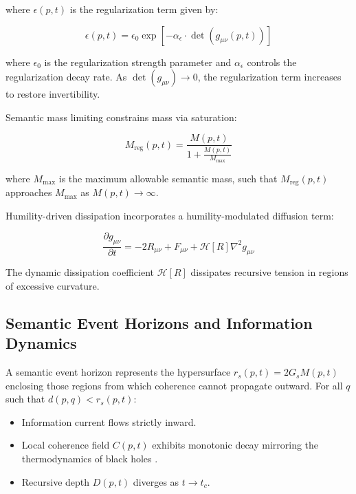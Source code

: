 where \(\epsilon(p, t)\) is the regularization term given by:

\begin{equation}
\epsilon(p, t) = \epsilon_0 \exp\left[-\alpha_{\epsilon} \cdot \det(g_{\mu\nu}(p, t))\right]
\end{equation}

where \(\epsilon_0\) is the regularization strength parameter and \(\alpha_{\epsilon}\) controls the regularization decay rate. As \(\det(g_{\mu\nu}) \to 0\), the regularization term increases to restore invertibility.

Semantic mass limiting constrains mass via saturation:

\begin{equation}
M_{\text{reg}}(p, t) = \frac{M(p, t)}{1 + \frac{M(p, t)}{M_{\text{max}}}}
\end{equation}

where \(M_{\text{max}}\) is the maximum allowable semantic mass, such that \(M_{\text{reg}}(p, t)\) approaches \(M_{\text{max}}\) as \(M(p, t) \to \infty\).

Humility-driven dissipation incorporates a humility-modulated diffusion term:

\begin{equation}
\frac{\partial g_{\mu\nu}}{\partial t} = -2R_{\mu\nu} + F_{\mu\nu} + \mathcal{H}[R] \nabla^2 g_{\mu\nu}
\end{equation}

The dynamic dissipation coefficient \(\mathcal{H}[R]\) dissipates recursive tension in regions of excessive curvature.


\subsection{Semantic Event Horizons and Information Dynamics}
\label{12.2.2:semantic_event_horizons_and_information_dynamics}

A semantic event horizon represents the hypersurface \(r_s(p, t) = 2G_s M(p, t)\) enclosing those regions from which coherence cannot propagate outward. For all \(q\) such that \(d(p, q) < r_s(p, t)\):

\begin{itemize}

    \item Information current flows strictly inward.

    \item Local coherence field \(C(p, t)\) exhibits monotonic decay mirroring the thermodynamics of black holes \autocite{Hawking1975}.

    \item Recursive depth \(D(p, t)\) diverges as \(t \to t_c\).

\end{itemize}

